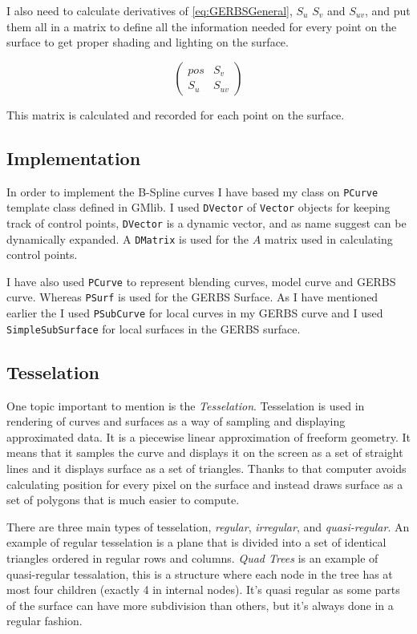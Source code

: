\documentclass[a4paper,12pt]{extarticle}
\begin{document}
I also need to calculate derivatives of \cref{eq:GERBSGeneral}, $S_u$ $S_v$ and $S_{uv}$, and put them all in a matrix to define all the information needed for every point on the surface to get proper shading and lighting on the surface.

\begin{equation}
\begin{pmatrix}
pos & S_v\\
S_u & S_{uv}
\end{pmatrix}
\end{equation}

This matrix is calculated and recorded for each point on the surface.

\subsection{Implementation}
In order to implement the B-Spline curves I have based my class on \verb|PCurve| template class defined in GMlib. I used \verb|DVector| of \verb|Vector| objects for keeping track of control points, \verb|DVector| is a dynamic vector, and as name suggest can be dynamically expanded. A \verb|DMatrix| is used for the $A$ matrix used in calculating control points.

I have also used \verb|PCurve| to represent blending curves, model curve and GERBS curve. Whereas \verb|PSurf| is used for the GERBS Surface. As I have mentioned earlier the I used \verb|PSubCurve| for local curves in my GERBS curve and I used \verb|SimpleSubSurface| for local surfaces in the GERBS surface.

\subsection{Tesselation}
One topic important to mention is the \emph{Tesselation}. Tesselation is used in rendering of curves and surfaces as a way of sampling and displaying approximated data. It is a piecewise linear approximation of freeform geometry. It means that it samples the curve and displays it on the screen as a set of straight lines and it displays surface as a set of triangles. Thanks to that computer avoids calculating position for every pixel on the surface and instead draws surface as a set of polygons that is much easier to compute.

There are three main types of tesselation, \emph{regular}, \emph{irregular}, and \emph{quasi-regular}. An example of regular tesselation is a plane that is divided into a set of identical triangles ordered in regular rows and columns. \emph{Quad Trees} is an example of quasi-regular tessalation, this is a structure where each node in the tree has at most four children (exactly 4 in internal nodes). It's quasi regular as some parts of the surface can have more subdivision than others, but it's always done in a regular fashion.
\end{document}
